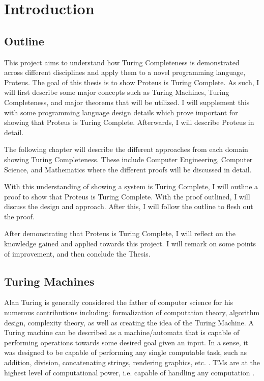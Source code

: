 \chapter{Introduction}\label{chapter:Intro}

\section{Outline}

This project aims to understand how Turing Completeness is demonstrated across different disciplines and apply them to a novel programming language, Proteus.
The goal of this thesis is to show Proteus is Turing Complete.
As such, I will first describe some major concepts such as Turing Machines, Turing Completeness, and major theorems that will be utilized.
I will supplement this with some programming language design details which prove important for showing that Proteus is Turing Complete.
Afterwards, I will describe Proteus in detail.

The following chapter will describe the different approaches from each domain showing Turing Completeness.
These include Computer Engineering, Computer Science, and Mathematics where the different proofs will be discussed in detail.

With this understanding of showing a system is Turing Complete, I will outline a proof to show that Proteus is Turing Complete.
With the proof outlined, I will discuss the design and approach.
After this, I will follow the outline to flesh out the proof.

After demonstrating that Proteus is Turing Complete, I will reflect on the knowledge gained and applied towards this project.
I will remark on some points of improvement, and then conclude the Thesis.

\section{Turing Machines}\label{sec:TM}

Alan Turing is generally considered the father of computer science for his numerous contributions including: formalization of computation theory, algorithm design, complexity theory, as well as creating the idea of the Turing Machine.
A Turing machine can be described as a machine/automata that is capable of performing operations towards some desired goal given an input.
In a sense, it was designed to be capable of performing any single computable task, such as addition, division, concatenating strings, rendering graphics, etc. \cite{TTTTM}.
TMs are at the highest level of computational power, i.e. capable of handling any computation \cite{ShallityAutomataThy}.

